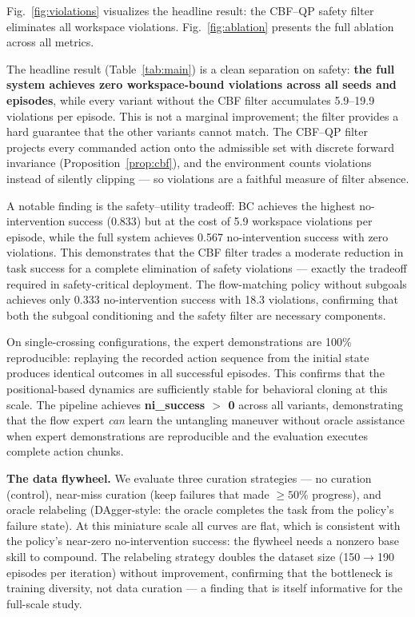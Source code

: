 \documentclass[11pt,a4paper]{article}
\begin{document}
Fig.~\ref{fig:violations} visualizes the headline result: the CBF--QP safety
filter eliminates all workspace violations. Fig.~\ref{fig:ablation} presents the
full ablation across all metrics.

The headline result (Table~\ref{tab:main}) is a clean separation on safety:
\textbf{the full system achieves zero workspace-bound violations across all
seeds and episodes}, while every variant without the CBF filter accumulates
5.9--19.9 violations per episode. This is not a marginal improvement; the filter
provides a hard guarantee that the other variants cannot match. The CBF--QP
filter projects every commanded action onto the admissible set with discrete
forward invariance (Proposition~\ref{prop:cbf}), and the environment counts
violations instead of silently clipping --- so violations are a faithful measure
of filter absence.

A notable finding is the safety--utility tradeoff: BC achieves the highest
no-intervention success (0.833) but at the cost of 5.9 workspace violations per
episode, while the full system achieves 0.567 no-intervention success with zero
violations. This demonstrates that the CBF filter trades a moderate reduction in
task success for a complete elimination of safety violations --- exactly the
tradeoff required in safety-critical deployment. The flow-matching policy without
subgoals achieves only 0.333 no-intervention success with 18.3 violations,
confirming that both the subgoal conditioning and the safety filter are
necessary components.

On single-crossing configurations, the expert demonstrations are 100\%
reproducible: replaying the recorded action sequence from the initial state
produces identical outcomes in all successful episodes. This confirms that the
positional-based dynamics are sufficiently stable for behavioral cloning at this
scale. The pipeline achieves \textbf{ni\_success $>$ 0} across all variants,
demonstrating that the flow expert \emph{can} learn the untangling maneuver
without oracle assistance when expert demonstrations are reproducible and the
evaluation executes complete action chunks.

\textbf{The data flywheel.} We evaluate three curation strategies --- no
curation (control), near-miss curation (keep failures that made $\ge 50\%$
progress), and oracle relabeling (DAgger-style: the oracle completes the task
from the policy's failure state). At this miniature scale all curves are flat,
which is consistent with the policy's near-zero no-intervention success: the
flywheel needs a nonzero base skill to compound. The relabeling strategy
doubles the dataset size (150$\to$190 episodes per iteration) without
improvement, confirming that the bottleneck is training diversity, not data
curation --- a finding that is itself informative for the full-scale study.
\end{document}
